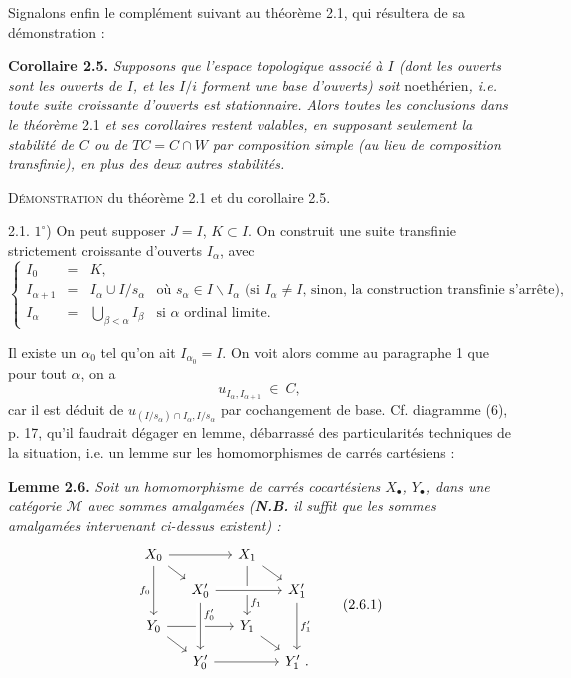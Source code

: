 \documentclass[11pt]{article}
\newcommand{\printedpage}[1]{\marginpar{\footnotesize p.~#1}}
\newcommand{\msp}[1]{\marginpar{\footnotesize [#1]}}
\newcommand{\M}{\mathcal{M}}
\begin{document}
Signalons enfin le complément suivant au théorème 2.1, qui résultera de sa démonstration :

\textbf{Corollaire 2.5.} \textit{Supposons que l'espace topologique associé à $I$ (dont les ouverts sont les ouverts de $I$, et les $I/i$ forment une base d'ouverts) soit} \textup{noethérien}\textit{, i.e. toute suite croissante d'ouverts est stationnaire. Alors toutes les conclusions dans le théorème} \textup{2.1} \textit{et ses corollaires restent valables, en supposant seulement la stabilité de $C$ ou de $TC = C \cap W$ par composition simple (au lieu de composition transfinie), en plus des deux autres stabilités.}

\printedpage{17}

\msp{page 30}

\textsc{Démonstration} du théorème 2.1 et du corollaire 2.5.

2.1. $1^\circ$) On peut supposer $J = I$, $K \subset I$. On construit une suite transfinie strictement croissante d'ouverts $I_\alpha$, avec
\[
\left\{
\begin{array}{rcll}
I_0 & = & K, & \\[1ex]
I_{\alpha+1} & = & I_\alpha \cup I/s_\alpha & \text{où } s_\alpha \in I\backslash I_\alpha \text{ (si } I_\alpha \neq I\text{, sinon, la construction transfinie s'arrête),}\\[1ex]
I_\alpha & = & \bigcup_{\beta<\alpha} I_\beta & \text{si } \alpha \text{ ordinal limite.}
\end{array}
\right.
\]

Il existe un $\alpha_0$ tel qu'on ait $I_{\alpha_0} = I$. On voit alors comme au paragraphe 1
\msp{page 31}
que pour tout $\alpha$, on a
\[
u_{I_\alpha,I_{\alpha+1}} \ \in\ C,
\tag*{$(*)$}
\]
car il est déduit de $u_{(I/s_\alpha)\cap I_\alpha,I/s_\alpha}$ par cochangement de base. Cf. diagramme (6), p. 17, qu'il faudrait dégager en lemme, débarrassé des particularités techniques de la situation, i.e. un lemme sur les homomorphismes de carrés cartésiens :

\textbf{Lemme 2.6.} \textit{Soit un homomorphisme de carrés cocartésiens $X_\bullet$, $Y_\bullet$, dans une catégorie $\M$ avec sommes amalgamées (\textbf{N.B.} il suffit que les sommes amalgamées intervenant ci-dessus existent) :}
\[
\begin{tikzcd}[row sep=small, column sep=small]
X_0 \arrow[rr] \arrow[dr] \arrow[dd, "f_0"'] & & X_1 \arrow[dr] \arrow[dd, "f_1" near end] & \\
 & X'_0 \arrow[rr, crossing over] & & X'_1 \arrow[dd, "f'_1"] \\
Y_0 \arrow[rr] \arrow[dr] & & Y_1 \arrow[dr] & \\
 & Y'_0 \arrow[rr] \arrow[from=uu, crossing over, "f'_0" near start] & & Y'_1 \ .
\end{tikzcd}
\tag*{(2.6.1)}
\]
\end{document}
